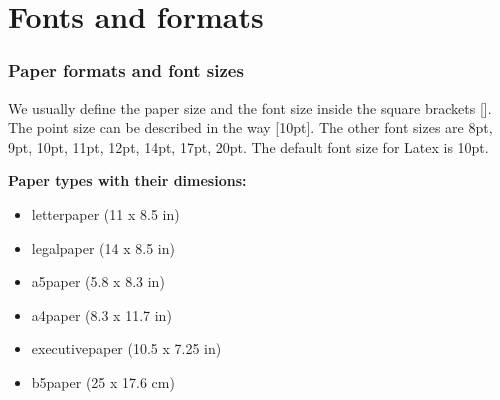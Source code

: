 \documentclass[11pt,a4paper]{report}
\theoremstyle{remark}
\theoremstyle{definition}
\begin{document}
	\section*{Fonts and formats}
		
		\subsubsection*{Paper formats and font sizes}
			We usually define the paper size and the font size inside the square brackets []. The point size can be described in the way [10pt]. The other font sizes are 8pt, 9pt, 10pt, 11pt, 12pt, 14pt, 17pt, 20pt. The default font size for Latex is 10pt.
		
			\begin{minipage}{0.5\textwidth}
				\textbf{Paper types with their dimesions:}
				\begin{itemize}
					\item letterpaper (11 x 8.5 in)
					\item legalpaper (14 x 8.5 in)
					\item a5paper (5.8 x 8.3 in)
					\item a4paper (8.3 x 11.7 in)
					\item executivepaper (10.5 x 7.25 in)
					\item b5paper (25 x 17.6 cm)
				\end{itemize}
			\end{minipage}
\end{document}
